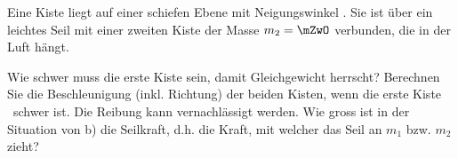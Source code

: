 Eine Kiste liegt auf einer schiefen Ebene mit Neigungswinkel \wiO. Sie ist über ein leichtes Seil mit einer zweiten Kiste der Masse $m_2 = \mZwO$ verbunden, die in der Luft hängt.

\begin{center}
\end{center}

\begin{abcliste}
\abc Wie schwer muss die erste Kiste sein, damit Gleichgewicht herrscht?
\abc Berechnen Sie die Beschleunigung (inkl. Richtung) der beiden Kisten, wenn die erste Kiste \mEiO\ schwer ist. Die Reibung kann vernachlässigt werden.
\abc Wie gross ist in der Situation von b) die Seilkraft, d.h. die Kraft, mit welcher das Seil an $m_1$ bzw. $m_2$ zieht?
\end{abcliste}
